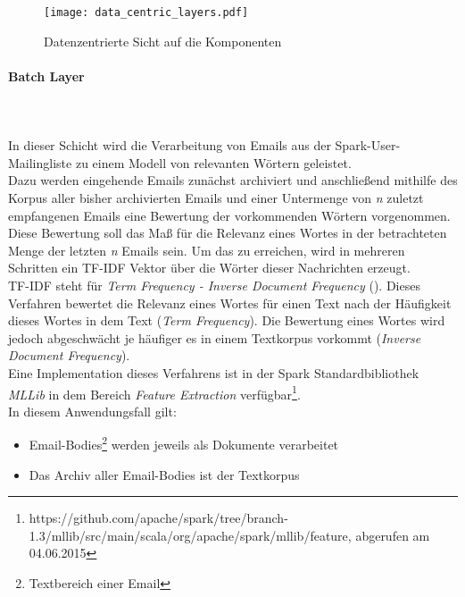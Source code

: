 \begin{figure}[ht!]
	\centering
  \texttt{[image: data\_centric\_layers.pdf]}
	\caption{Datenzentrierte Sicht auf die Komponenten}
	\label{figure:data_centric_layers}
\end{figure}

\paragraph{Batch Layer}\\
\\

In dieser Schicht wird die Verarbeitung von Emails aus der Spark-User-Mailingliste zu einem Modell von relevanten Wörtern geleistet.\\

Dazu werden eingehende Emails zunächst archiviert und anschließend mithilfe des Korpus aller bisher archivierten Emails und einer Untermenge von \textit{n} zuletzt empfangenen Emails eine Bewertung der vorkommenden Wörtern vorgenommen.\\

Diese Bewertung soll das Maß für die Relevanz eines Wortes in der betrachteten Menge der letzten \textit{n} Emails sein. Um das zu erreichen, wird in mehreren Schritten ein TF-IDF Vektor über die Wörter dieser Nachrichten erzeugt.\\

TF-IDF steht für \textit{Term Frequency - Inverse Document Frequency} (\cite{SparckJones:1988:SIT:106765.106782}). Dieses Verfahren bewertet die Relevanz eines Wortes für einen Text nach der Häufigkeit dieses Wortes in dem Text (\textit{Term Frequency}). Die Bewertung eines Wortes wird jedoch abgeschwächt je häufiger es in einem Textkorpus vorkommt (\textit{Inverse Document Frequency}).\\

Eine Implementation dieses Verfahrens ist in der Spark Standardbibliothek \textit{MLLib} in dem Bereich \textit{Feature Extraction} verfügbar\footnote{https://github.com/apache/spark/tree/branch-1.3/mllib/src/main/scala/org/apache/spark/mllib/feature, abgerufen am 04.06.2015}.\\

In diesem Anwendungsfall gilt:
\begin{itemize}
\item Email-Bodies\footnote{Textbereich einer Email} werden jeweils als Dokumente verarbeitet
\item Das Archiv aller Email-Bodies ist der Textkorpus
\end{itemize}

